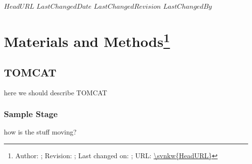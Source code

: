 \svnidlong
{$HeadURL$}
{$LastChangedDate$}
{$LastChangedRevision$}
{$LastChangedBy$}
\section{Materials and Methods\footnote{Author: \svnauthor; Revision: \svnrev; Last changed on: \svndate; URL: \url{\svnkw{HeadURL}}}}
\subsection{TOMCAT}
here we should describe TOMCAT
\subsubsection{Sample Stage}
how is the stuff moving?
